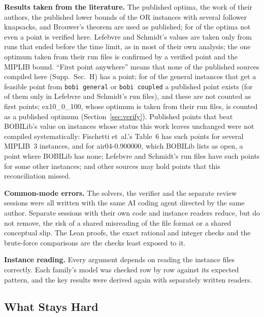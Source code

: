 \documentclass[]{spie}  %
\theoremstyle{plain}
\newcommand{\code}[1]{\texttt{#1}}
\newcommand{\inst}[1]{\mbox{#1}}             %
\begin{document}
\textbf{Results taken from the literature.} The \NumLitOptimal{} published optima, the work of
their authors, the published lower bounds of the OR instances with several follower knapsacks,
and Brouwer's theorem are used as published; for \NumLitNoFile{} of the optima not even a point is
verified here. Lefebvre and Schmidt's values are taken only from runs that ended before the time
limit, as in most of their own analysis; the one optimum taken from their run files is confirmed
by a verified point and the MIPLIB bound. ``First point anywhere'' means that none of the published sources
compiled here (Supp.\ Sec.~H) has a point; for \NumGeneralPublishedPoint{} of the general instances
that get a feasible point from \code{bobi general} or \code{bobi coupled} a published point exists
(for \NumGeneralPublishedLS{} of them only in Lefebvre and Schmidt's run files), and these are not
counted as first points; \inst{ex10\_0\_100}, whose optimum is taken from their run files, is
counted as a published optimum (Section~\ref{sec:verify}). Published points
that beat BOBILib's value on instances whose status this work leaves unchanged were not compiled
systematically: Fischetti et~al.'s Table~6 has such points for several MIPLIB~3 instances, and for
\inst{air04-0.900000}, which BOBILib lists as open, a point where BOBILib has
none;\cite{fischetti2017new} Lefebvre and Schmidt's run files have such points for some other
instances; and other sources may hold points that this reconciliation missed.

\textbf{Common-mode errors.} The solvers, the verifier and the separate review sessions were all
written with the same AI coding agent directed by the same author. Separate sessions with their own
code and instance readers reduce, but do not remove, the risk of a shared misreading of the file
format or a shared conceptual slip. The Lean proofs, the exact rational and integer checks and the
brute-force comparisons are the checks least exposed to it.

\textbf{Instance reading.} Every argument depends on reading the instance files correctly. Each
family's model was checked row by row against its expected pattern, and the key results were
derived again with separately written readers.

\subsection{What Stays Hard}
\end{document}
